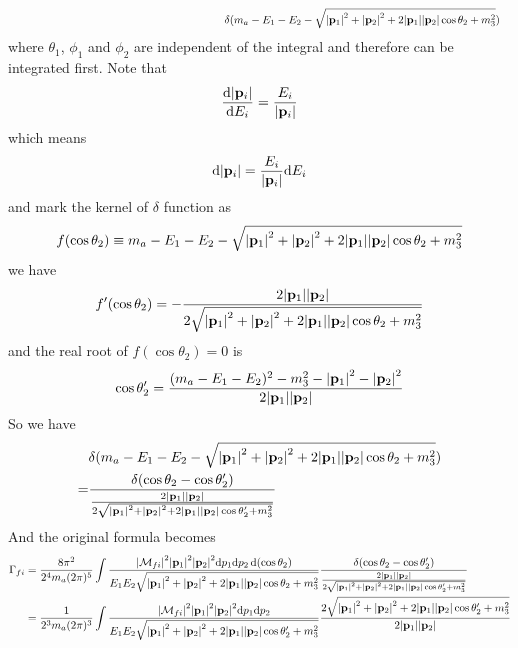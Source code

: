 \documentclass{article}
\newcommand{\apo}{\abs{\vb{p}_1}}
\newcommand{\aps}{\abs{\vb{p}_2}}
\begin{document}
\begin{enumerate}[\bf1.]
\begin{align*}
    &\;\;\;\;\;\;\;\;\;\;\;\;\;\;\;\;\;\;\;\;\;\;\;\;\;\;\;\;\;\;\;\;\;\;\;\;\;\;\;\;\;\;\;\;\;\;\;\;\;\;\;\;\;\;\;\;\;\;\;\;\;\;\;\;\;\;\;\;\;\;\;\delta(m_a-E_1-E_2-\sqrt{\abs{\vb{p}_1}^2+\abs{\vb{p}_2}^2+2\abs{\vb{p}_1}\abs{\vb{p}_2}\cos\theta_2+m_3^2})
  \end{align*}
  where $\theta_1$, $\phi_1$ and $\phi_2$ are independent of the integral and therefore can be integrated first. Note that
  \begin{align*}
    \frac{\dd \abs{\vb{p}_i}}{\dd E_i}=\frac{E_i}{\abs{\vb{p}_i}}
  \end{align*}
  which means
  \begin{align*}
    \dd \abs{\vb{p}_i}=\frac{E_i}{\abs{\vb{p}_i}}\dd E_i
  \end{align*}
  and mark the kernel of $\delta$ function as
  \begin{align*}
    f(\cos\theta_2)\equiv m_a-E_1-E_2-\sqrt{\abs{\vb{p}_1}^2+\abs{\vb{p}_2}^2+2\abs{\vb{p}_1}\abs{\vb{p}_2}\cos\theta_2+m_3^2}
  \end{align*}
  we have
  \begin{align*}
    f'(\cos\theta_2)=-\frac{2\apo\aps}{2\sqrt{\apo^2+\aps^2+2\apo\aps\cos\theta_2+m_3^2}}
  \end{align*}
  and the real root of $f(\cos\theta_2)=0$ is
  \begin{align*}
    \cos\theta'_2=\frac{(m_a-E_1-E_2)^2-m_3^2-\apo^2-\aps^2}{2\apo\aps}
  \end{align*}
  So we have
  \begin{align*}
    &\delta(m_a-E_1-E_2-\sqrt{\abs{\vb{p}_1}^2+\abs{\vb{p}_2}^2+2\abs{\vb{p}_1}\abs{\vb{p}_2}\cos\theta_2+m_3^2})\\
    =&\frac{\delta(\cos\theta_2-\cos\theta_2')}{\frac{2\apo\aps}{2\sqrt{\apo^2+\aps^2+2\apo\aps\cos\theta'_2+m_3^2}}}
  \end{align*}
  And the original formula becomes
  \begin{align*}
    \Gamma_{fi}&=\frac{8\pi^2}{2^4m_a(2\pi)^5}\int\frac{\abs{\mathcal{M}_{fi}}^2\abs{\vb{p}_1}^2\abs{\vb{p}_2}^2\dd p_1\dd p_2\dd(\cos\theta_2)}{E_1E_2\sqrt{\abs{\vb{p}_1}^2+\abs{\vb{p}_2}^2+2\abs{\vb{p}_1}\abs{\vb{p}_2}\cos\theta_2+m_3^2}}\frac{\delta(\cos\theta_2-\cos\theta_2')}{\frac{2\apo\aps}{2\sqrt{\apo^2+\aps^2+2\apo\aps\cos\theta'_2+m_3^2}}}\\
    &=\frac{1}{2^3m_a(2\pi)^3}\int\frac{\abs{\mathcal{M}_{fi}}^2\abs{\vb{p}_1}^2\abs{\vb{p}_2}^2\dd p_1\dd p_2}{E_1E_2\sqrt{\abs{\vb{p}_1}^2+\abs{\vb{p}_2}^2+2\abs{\vb{p}_1}\abs{\vb{p}_2}\cos\theta'_2+m_3^2}}\frac{2\sqrt{\apo^2+\aps^2+2\apo\aps\cos\theta'_2+m_3^2}}{2\apo\aps}\\

\end{align*}
\end{enumerate}
\end{document}

